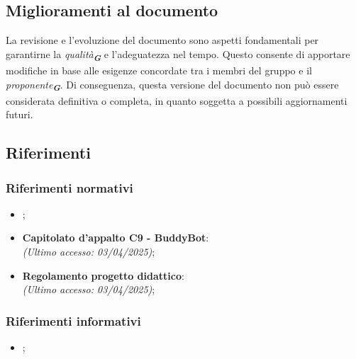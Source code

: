 \subsection{Miglioramenti al documento}
La revisione e l’evoluzione del documento sono aspetti fondamentali per garantirne la \emph{qualità}\textsubscript{\textbf{\textit{G}}}
e l’adeguatezza nel tempo.
Questo consente di apportare modifiche in base alle esigenze concordate tra i membri del gruppo e il
\emph{proponente}\textsubscript{\textbf{\textit{G}}}.
Di conseguenza, questa versione del documento non può essere considerata definitiva o completa, in quanto soggetta a possibili
aggiornamenti futuri.

\subsection{Riferimenti}
\label{sec:riferimenti}

\subsubsection{Riferimenti normativi}
\begin{itemize}
    \item {}; \\
    \item \textbf{Capitolato d'appalto C9 - BuddyBot}: \\
    \emph{(Ultimo accesso: 03/04/2025)};\\
    \item \textbf{Regolamento progetto didattico}:\\
    \emph{(Ultimo accesso: 03/04/2025)};\\
\end{itemize}

\subsubsection{Riferimenti informativi}
\begin{itemize}
    \item {}; \\
\end{itemize}
